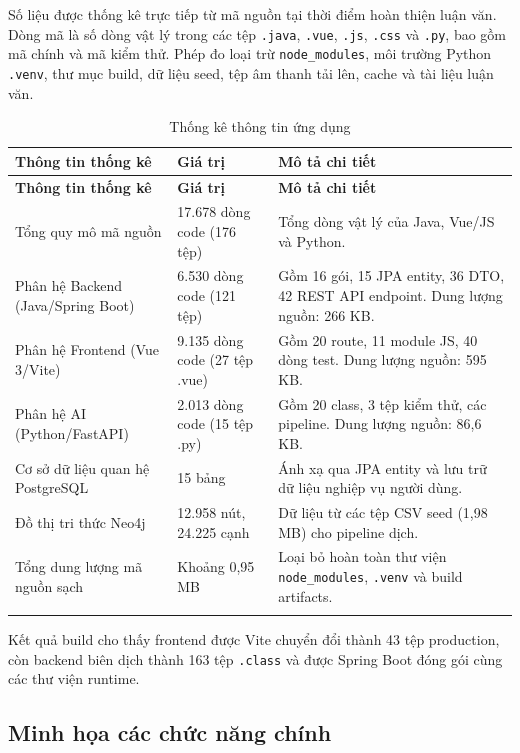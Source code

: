 \documentclass[../DoAn.tex]{subfiles}
\begin{document}
Số liệu được thống kê trực tiếp từ mã nguồn tại thời điểm hoàn thiện luận văn. Dòng mã là số dòng vật lý trong các tệp \texttt{.java}, \texttt{.vue}, \texttt{.js}, \texttt{.css} và \texttt{.py}, bao gồm mã chính và mã kiểm thử. Phép đo loại trừ \texttt{node\_modules}, môi trường Python \texttt{.venv}, thư mục build, dữ liệu seed, tệp âm thanh tải lên, cache và tài liệu luận văn.

\begin{longtable}{|p{5.0cm}|p{3.0cm}|p{5.0cm}|}
\hline
\textbf{Thông tin thống kê} & \textbf{Giá trị} & \textbf{Mô tả chi tiết} \\
\hline
\endfirsthead
\hline
\textbf{Thông tin thống kê} & \textbf{Giá trị} & \textbf{Mô tả chi tiết} \\
\hline
\endhead
Tổng quy mô mã nguồn & 17.678 dòng code (176 tệp) & Tổng dòng vật lý của Java, Vue/JS và Python. \\
\hline
Phân hệ Backend (Java/Spring Boot) & 6.530 dòng code (121 tệp) & Gồm 16 gói, 15 JPA entity, 36 DTO, 42 REST API endpoint. Dung lượng nguồn: 266 KB. \\
\hline
Phân hệ Frontend (Vue 3/Vite) & 9.135 dòng code (27 tệp .vue) & Gồm 20 route, 11 module JS, 40 dòng test. Dung lượng nguồn: 595 KB. \\
\hline
Phân hệ AI (Python/FastAPI) & 2.013 dòng code (15 tệp .py) & Gồm 20 class, 3 tệp kiểm thử, các pipeline. Dung lượng nguồn: 86,6 KB. \\
\hline
Cơ sở dữ liệu quan hệ PostgreSQL & 15 bảng & Ánh xạ qua JPA entity và lưu trữ dữ liệu nghiệp vụ người dùng. \\
\hline
Đồ thị tri thức Neo4j & 12.958 nút, 24.225 cạnh & Dữ liệu từ các tệp CSV seed (1,98 MB) cho pipeline dịch. \\
\hline
Tổng dung lượng mã nguồn sạch & Khoảng 0,95 MB & Loại bỏ hoàn toàn thư viện \texttt{node\_modules}, \texttt{.venv} và build artifacts. \\
\hline
\caption{Thống kê thông tin ứng dụng}
\label{table:4.12}\\
\end{longtable}

Kết quả build cho thấy frontend được Vite chuyển đổi thành 43 tệp production, còn backend biên dịch thành 163 tệp \texttt{.class} và được Spring Boot đóng gói cùng các thư viện runtime.

\subsection{Minh họa các chức năng chính}
\label{subsection:4.3.3}
\end{document}
